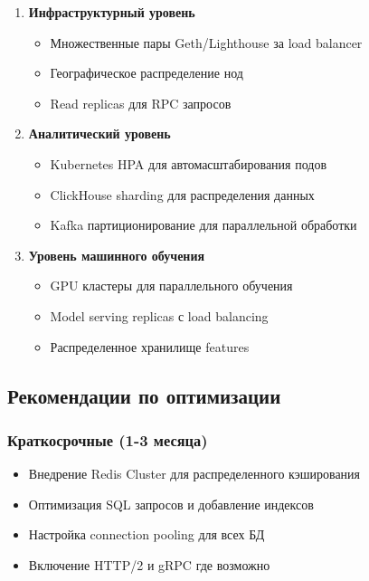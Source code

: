 \documentclass[a4paper,11pt]{article}
\begin{document}
\begin{enumerate}
    \item \textbf{Инфраструктурный уровень}
    \begin{itemize}
        \item Множественные пары Geth/Lighthouse за load balancer
        \item Географическое распределение нод
        \item Read replicas для RPC запросов
    \end{itemize}
    
    \item \textbf{Аналитический уровень}
    \begin{itemize}
        \item Kubernetes HPA для автомасштабирования подов
        \item ClickHouse sharding для распределения данных
        \item Kafka партиционирование для параллельной обработки
    \end{itemize}
    
    \item \textbf{Уровень машинного обучения}
    \begin{itemize}
        \item GPU кластеры для параллельного обучения
        \item Model serving replicas с load balancing
        \item Распределенное хранилище features
    \end{itemize}
\end{enumerate}

\subsection{Рекомендации по оптимизации}

\subsubsection{Краткосрочные (1-3 месяца)}
\begin{itemize}
    \item Внедрение Redis Cluster для распределенного кэширования
    \item Оптимизация SQL запросов и добавление индексов
    \item Настройка connection pooling для всех БД
    \item Включение HTTP/2 и gRPC где возможно
\end{itemize}
\end{document}
